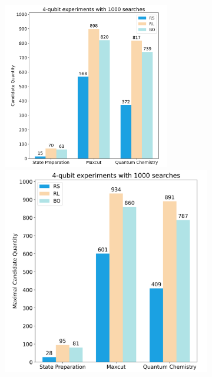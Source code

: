 \documentclass{article} %
\begin{document}
\begin{figure}[htbp]
    \centering
    \begin{subfigure}[b]{0.48\textwidth}
        \centering
        \begin{minipage}[b]{0.7\textwidth}
            \centering
            \includegraphics[width=0.8\textwidth]{images/4-qubits_experiments_candidates.png}
        \end{minipage}
        \hspace{-1em}
        \begin{minipage}[b]{0.28\textwidth}
            \centering
            \includegraphics[width=\textwidth]{images/4-qubits_experiments_candidates_max.png}

\end{minipage}
\end{subfigure}
\end{figure}
\end{document}

